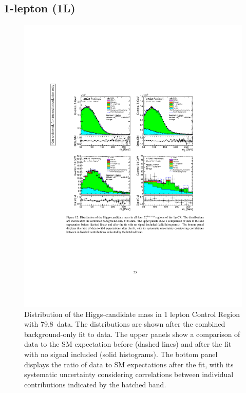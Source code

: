 \subsection{1-lepton (1L)}
\begin{figure}[H]
    \includegraphics[width=15cm,trim={4cm 9cm 4cm 6cm}, clip]{chapters/c9/figures/post-fit-1lep.pdf}

  \caption{Distribution of the Higgs-candidate mass in 1 lepton Control Region with 79.8~\ifb data. The distributions are shown after the combined background-only fit to data. The upper panels show a comparison of data to the SM expectation before (dashed lines) and after the fit with no signal included (solid histograms). The bottom panel displays the ratio of data to SM expectations after the fit, with its systematic uncertainty considering correlations between individual contributions indicated by the hatched band.}
  \label{fig:Data_MC_CR1_mu_charge_2b_postfit}
\end{figure}

